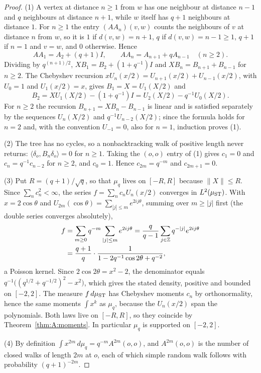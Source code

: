 \begin{proof}
(1) A vertex at distance $n\ge1$ from $w$ has one neighbour at distance $n-1$ and $q$ neighbours at distance $n+1$, while $w$ itself has $q+1$ neighbours at distance $1$. For $n\ge1$ the entry $(AA_n)(v,w)$ counts the neighbours of $v$ at distance $n$ from $w$, so it is $1$ if $d(v,w)=n+1$, $q$ if $d(v,w)=n-1\ge1$, $q+1$ if $n=1$ and $v=w$, and $0$ otherwise. Hence
\[
AA_1=A_2+(q+1)I,\qquad AA_n=A_{n+1}+qA_{n-1}\quad(n\ge2).
\]
Dividing by $q^{(n+1)/2}$, $XB_1=B_2+(1+q^{-1})I$ and $XB_n=B_{n+1}+B_{n-1}$ for $n\ge2$. The Chebyshev recursion $xU_n(x/2)=U_{n+1}(x/2)+U_{n-1}(x/2)$, with $U_0=1$ and $U_1(x/2)=x$, gives $B_1=X=U_1(X/2)$ and
\[
B_2=XU_1(X/2)-(1+q^{-1})I=U_2(X/2)-q^{-1}U_0(X/2).
\]
For $n\ge2$ the recursion $B_{n+1}=XB_n-B_{n-1}$ is linear and is satisfied separately by the sequences $U_n(X/2)$ and $q^{-1}U_{n-2}(X/2)$; since the formula holds for $n=2$ and, with the convention $U_{-1}=0$, also for $n=1$, induction proves (1).

(2) The tree has no cycles, so a nonbacktracking walk of positive length never returns: $\langle\delta_o,B_n\delta_o\rangle=0$ for $n\ge1$. Taking the $(o,o)$ entry of (1) gives $c_1=0$ and $c_n=q^{-1}c_{n-2}$ for $n\ge2$, and $c_0=1$. Hence $c_{2m}=q^{-m}$ and $c_{2m+1}=0$.

(3) Put $R=(q+1)/\sqrt q$, so that $\mu_q$ lives on $[-R,R]$ because $\|X\|\le R$. Since $\sum_nc_n^2<\infty$, the series $f=\sum_nc_nU_n(x/2)$ converges in $L^2(\mu_{\mathrm{ST}})$. With $x=2\cos\theta$ and $U_{2m}(\cos\theta)=\sum_{|j|\le m}e^{2ij\theta}$, summing over $m\ge|j|$ first (the double series converges absolutely),
\[
\begin{aligned}
f&=\sum_{m\ge0}q^{-m}\sum_{|j|\le m}e^{2ij\theta}=\frac{q}{q-1}\sum_{j\in\mathbb{Z}}q^{-|j|}e^{2ij\theta}\\
&=\frac{q+1}{q}\cdot\frac{1}{1-2q^{-1}\cos2\theta+q^{-2}},
\end{aligned}
\]
a Poisson kernel. Since $2\cos2\theta=x^2-2$, the denominator equals $q^{-1}\bigl((q^{1/2}+q^{-1/2})^2-x^2\bigr)$, which gives the stated density, positive and bounded on $[-2,2]$. The measure $f\,d\mu_{\mathrm{ST}}$ has Chebyshev moments $c_n$ by orthonormality, hence the same moments $\int x^k$ as $\mu_q$, because the $U_n(x/2)$ span the polynomials. Both laws live on $[-R,R]$, so they coincide by Theorem~\ref{thm:A:moments}. In particular $\mu_q$ is supported on $[-2,2]$.

(4) By definition $\int x^{2m}\,d\mu_q=q^{-m}A^{2m}(o,o)$, and $A^{2m}(o,o)$ is the number of closed walks of length $2m$ at $o$, each of which simple random walk follows with probability $(q+1)^{-2m}$.


\end{proof}
